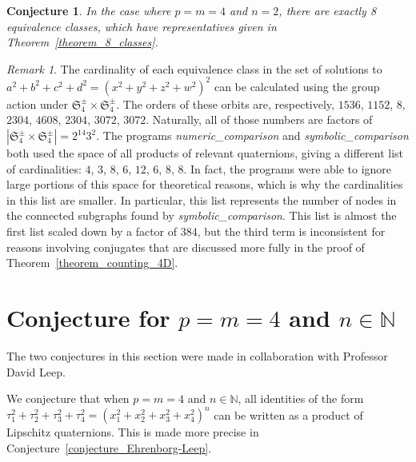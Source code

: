 \documentclass[12pt,table]{article}
\newtheorem{conjecture}[theorem]{Conjecture}
\theoremstyle{definition}
\theoremstyle{remark}
\newtheorem{remark}[theorem]{Remark}
\newcommand{\Nnn}{\mathbb N}
\numberwithin{equation}{section}
\begin{document}
\begin{conjecture}
In the case where  $p = m = 4$ and $n = 2$,
there are exactly 8 equivalence classes, which have representatives
given in Theorem~\ref{theorem_8_classes}.
\end{conjecture}

\begin{remark}
The cardinality of each equivalence class in the
set of solutions to $a^2 + b^2 + c^2 + d^2 = (x^2 + y^2 + z^2 + w^2)^2$
can be calculated using the group action under
$ \mathfrak{S}_4^\pm \times \mathfrak{S}_4^\pm $.
The orders of these orbits are, respectively,
$1536$, $1152$, $8$, $2304$, $4608$, $2304$, $3072$, $3072$.
Naturally, all of those numbers are factors of
$ | \mathfrak{S}_4^\pm \times \mathfrak{S}_4^\pm | = 2^{14} 3^2 $.
The programs \emph{numeric\_comparison} and \emph{symbolic\_comparison} 
both used the space of all products of relevant quaternions,
giving a different list of cardinalities:
$4$, $3$, $8$, $6$, $12$, $6$, $8$, $8$.
In fact, the programs were able to ignore large
portions of this space for theoretical reasons,
which is why the cardinalities in this list are
smaller.
In particular, this list represents the number of
nodes in the connected subgraphs found by  \emph{symbolic\_comparison}.
This list is almost the first list
scaled down by a factor of 384, but the third term is inconsistent
for reasons involving conjugates that are discussed more fully in
the proof of Theorem~\ref{theorem_counting_4D}.
\end{remark}

\section{Conjecture for $p = m = 4$ and $ n \in \Nnn $}
The two conjectures in this section were made in collaboration with
Professor David Leep.

We conjecture that when $p = m = 4$ and $ n \in \Nnn $,
all identities of the form
$
\tau_1 ^ 2  + \tau_2 ^ 2  + \tau_3 ^ 2  + \tau_4 ^ 2  
= 
\left(  x_1 ^ 2 + x_2 ^ 2 + x_3 ^ 2 + x_4 ^ 2
\right) ^ n 
$
can be written as
a product of Lipschitz quaternions.
This is made more precise in
Conjecture~\ref{conjecture_Ehrenborg-Leep}.
\end{document}
